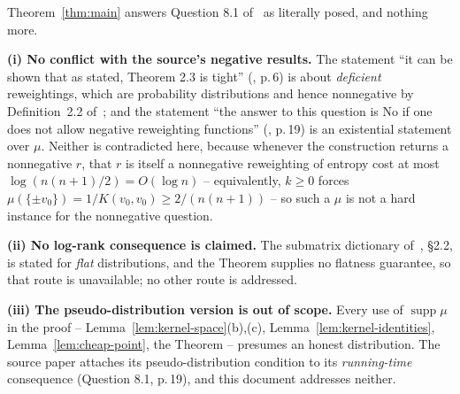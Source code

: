 \documentclass{aicr-solution}
\newcommand{\supp}{\operatorname{supp}}
\begin{document}
\begin{remark}[scope]\label{rem:scope}
Theorem~\ref{thm:main} answers Question 8.1 of~\cite{BKS16} as
literally posed, and nothing more.

\smallskip
\noindent\textbf{(i) No conflict with the source's negative results.}
The statement ``it can be shown that as stated, Theorem 2.3 is
tight'' (\cite{BKS16}, p.\,6) is about \emph{deficient} reweightings,
which are probability distributions and hence nonnegative by
Definition~2.2 of~\cite{BKS16}; and the statement ``the answer to this
question is No if one does not allow negative reweighting functions''
(\cite{BKS16}, p.\,19) is an existential statement over $\mu$. Neither
is contradicted here, because whenever the construction returns a
nonnegative $r$, that $r$ is itself a nonnegative reweighting of
entropy cost at most $\log(n(n+1)/2) = O(\log n)$ -- equivalently, $k
\ge 0$ forces $\mu(\{\pm v_{0}\}) = 1/K(v_{0},v_{0}) \ge 2/(n(n+1))$ --
so such a $\mu$ is not a hard instance for the nonnegative question.

\smallskip
\noindent\textbf{(ii) No log-rank consequence is claimed.} The
submatrix dictionary of~\cite{BKS16}, \S 2.2, is stated for
\emph{flat} distributions, and the Theorem supplies no flatness
guarantee, so that route is unavailable; no other route is addressed.

\smallskip
\noindent\textbf{(iii) The pseudo-distribution version is out of
scope.} Every use of $\supp\mu$ in the proof --
Lemma~\ref{lem:kernel-space}(b),(c), Lemma~\ref{lem:kernel-identities},
Lemma~\ref{lem:cheap-point}, the Theorem -- presumes an honest
distribution. The source paper attaches its pseudo-distribution
condition to its \emph{running-time} consequence (Question 8.1, p.\,19),
and this document addresses neither.


\end{remark}
\end{document}
